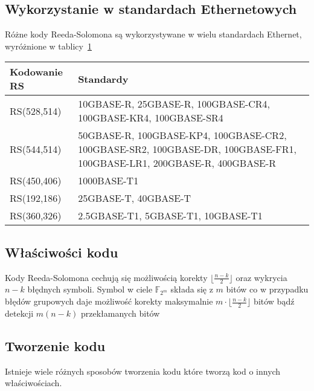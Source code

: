 \subsection{Wykorzystanie w standardach Ethernetowych}

Różne kody Reeda-Solomona są wykorzystywane w wielu standardach Ethernet,
wyróżnione w tablicy~\ref{standards:title}

\begingroup
{}
\begin{table}[h]
\label{standards:title}
\centering
    \begin{tabular}{m{3cm} m{9cm}}
    \toprule
    Kodowanie RS    & Standardy                                                         \\
    \midrule
    RS(528,514)     & 10GBASE-R, 25GBASE-R, 100GBASE-CR4, 100GBASE-KR4, 100GBASE-SR4    \\
    \midrule
    RS(544,514)     & 50GBASE-R, 100GBASE-KP4, 100GBASE-CR2, 100GBASE-SR2, 100GBASE-DR, 100GBASE-FR1, 100GBASE-LR1, 200GBASE-R, 400GBASE-R \\
    \midrule
    RS(450,406)     & 1000BASE-T1                                                       \\
    \midrule
    RS(192,186)     & 25GBASE-T, 40GBASE-T                                              \\
    \midrule
    RS(360,326)     & 2.5GBASE-T1, 5GBASE-T1, 10GBASE-T1                                \\
    \bottomrule
    \end{tabular}
\end{table}
\endgroup

\subsection{Właściwości kodu}
Kody Reeda-Solomona cechują się możliwością korekty $\lfloor \frac{n-k}{2} \rfloor$
oraz wykrycia $n-k$ błędnych symboli. Symbol w ciele $\mathbb{F}_{2^m}$ składa się
z $m$ bitów co w przypadku błędów grupowych daje możliwość korekty maksymalnie
$m \cdot \lfloor \frac{n-k}{2} \rfloor$ bitów bądź detekcji $m(n-k)$ przekłamanych
bitów

\subsection{Tworzenie kodu}
Istnieje wiele różnych sposobów tworzenia kodu które tworzą kod o innych właściwościach.


